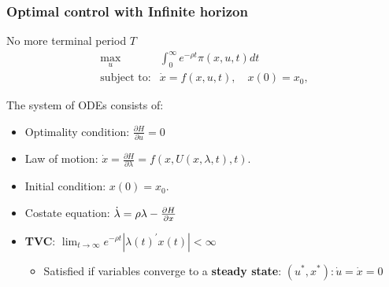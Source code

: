 \documentclass[bigger,handout]{beamer}
\newenvironment{stepitemize}{\begin{itemize}[<+->]}{\end{itemize} }
\begin{document}
 
 
\begin{frame}%
 
\frametitle{Optimal control with Infinite horizon }

No more terminal period $T$ 
\begin{equation*}
\begin{array}{rl}
\max_{u} & \int_{0}^{\mathbf{\infty }}e^{-\rho t}\pi (x,u,t)dt \\ 
\text{subject to:} & \dot{x}=f(x,u,t),\quad x(0)=x_{0},%
\end{array}%
\end{equation*}

The system of ODEs consists of:

\begin{stepitemize}
\item Optimality condition: $\frac{\partial H}{\partial u}=0$

\item Law of motion: $\dot{x}=\frac{\partial H}{\partial \lambda }%
=f(x,U(x,\lambda ,t),t)$.

\item Initial condition: $x(0)=x_{0}.$

\item Costate equation: $\dot{\lambda}=\rho \lambda -\frac{\partial H}{%
\partial x}$

\item \textbf{TVC}: $\lim_{t\rightarrow \infty }e^{-\rho t}|\lambda
(t)^{\prime }x(t)|<\infty $

\begin{itemize}
\item Satisfied if variables converge to a \textbf{steady state}: \newline
$\left( u^{\ast },x^{\ast }\right) :\dot{u}=\dot{x}=0$
\end{itemize}
\end{stepitemize}

 
 
\end{frame}%
 
 
 
\end{document}
